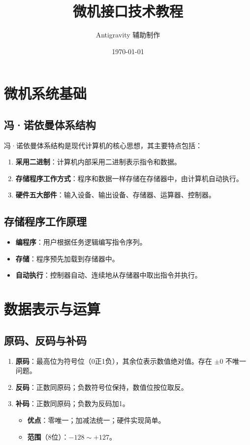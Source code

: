 \documentclass[12pt,a4paper]{ctexart}
\title{微机接口技术教程}
\author{Antigravity 辅助制作}
\date{\today}
\begin{document}
\maketitle
\tableofcontents
\newpage

\section{微机系统基础}

\subsection{冯·诺依曼体系结构}
冯·诺依曼体系结构是现代计算机的核心思想，其主要特点包括：
\begin{enumerate}
    \item \textbf{采用二进制}：计算机内部采用二进制表示指令和数据。
    \item \textbf{存储程序工作方式}：程序和数据一样存储在存储器中，由计算机自动执行。
    \item \textbf{硬件五大部件}：输入设备、输出设备、存储器、运算器、控制器。
\end{enumerate}

\subsection{存储程序工作原理}
\begin{itemize}
    \item \textbf{编程序}：用户根据任务逻辑编写指令序列。
    \item \textbf{存储}：程序预先加载到存储器中。
    \item \textbf{自动执行}：控制器自动、连续地从存储器中取出指令并执行。
\end{itemize}

\section{数据表示与运算}

\subsection{原码、反码与补码}
\begin{enumerate}
    \item \textbf{原码}：最高位为符号位（0正1负），其余位表示数值绝对值。存在 $\pm 0$ 不唯一问题。
    \item \textbf{反码}：正数同原码；负数符号位保持，数值位按位取反。
    \item \textbf{补码}：正数同原码；负数为反码加1。
    \begin{itemize}
        \item \textbf{优点}：零唯一；加减法统一；硬件实现简单。
        \item \textbf{范围}（8位）：$-128 \sim +127$。
    \end{itemize}
\end{enumerate}
\end{document}

